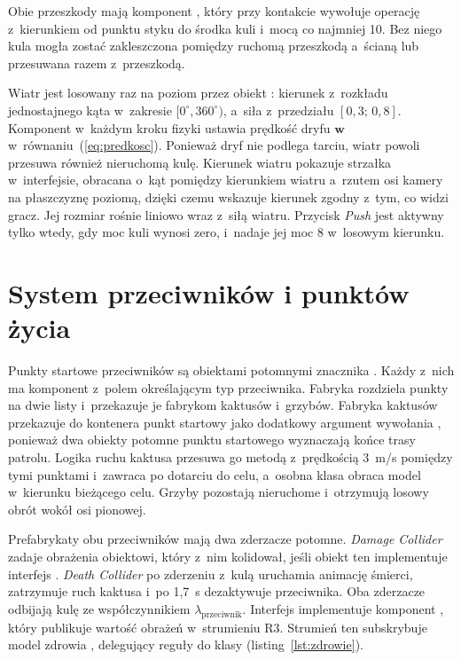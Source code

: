 Obie przeszkody mają komponent , który przy kontakcie wywołuje
operację  z~kierunkiem od punktu styku do środka kuli i~mocą co najmniej 10.
Bez niego kula mogła zostać zakleszczona pomiędzy ruchomą przeszkodą a~ścianą lub
przesuwana razem z~przeszkodą.

Wiatr jest losowany raz na poziom przez obiekt : kierunek z~rozkładu
jednostajnego kąta w~zakresie $[0^\circ, 360^\circ)$, a~siła z~przedziału $[0{,}3;\,0{,}8]$.
Komponent  w~każdym kroku fizyki ustawia prędkość dryfu $\mathbf{w}$
w~równaniu~(\ref{eq:predkosc}). Ponieważ dryf nie podlega tarciu, wiatr powoli przesuwa
również nieruchomą kulę. Kierunek wiatru pokazuje strzałka w~interfejsie, obracana
o~kąt pomiędzy kierunkiem wiatru a~rzutem osi kamery na płaszczyznę poziomą, dzięki czemu
wskazuje kierunek zgodny z~tym, co widzi gracz. Jej rozmiar rośnie liniowo wraz z~siłą
wiatru. Przycisk \emph{Push} jest aktywny tylko wtedy, gdy moc kuli wynosi zero, i~nadaje
jej moc 8 w~losowym kierunku.

\section{System przeciwników i punktów życia}

Punkty startowe przeciwników są obiektami potomnymi znacznika .
Każdy z~nich ma komponent  z~polem określającym typ przeciwnika.
Fabryka  rozdziela punkty na dwie listy i~przekazuje je fabrykom
kaktusów i~grzybów. Fabryka kaktusów przekazuje do kontenera punkt startowy jako
dodatkowy argument wywołania , ponieważ dwa obiekty
potomne punktu startowego wyznaczają końce trasy patrolu. Logika ruchu kaktusa przesuwa go
metodą  z~prędkością 3~m/s pomiędzy tymi punktami i~zawraca po
dotarciu do celu, a~osobna klasa obraca model w~kierunku bieżącego celu. Grzyby pozostają
nieruchome i~otrzymują losowy obrót wokół osi pionowej.

Prefabrykaty obu przeciwników mają dwa zderzacze potomne. \emph{Damage Collider} zadaje
obrażenia obiektowi, który z~nim kolidował, jeśli obiekt ten implementuje interfejs
. \emph{Death Collider} po zderzeniu z~kulą uruchamia animację śmierci,
zatrzymuje ruch kaktusa i~po 1,7~s dezaktywuje przeciwnika. Oba zderzacze odbijają kulę
ze współczynnikiem $\lambda_{\text{przeciwnik}}$. Interfejs  implementuje
komponent , który publikuje wartość obrażeń w~strumieniu R3. Strumień
ten subskrybuje model zdrowia , delegujący reguły do klasy
 (listing~\ref{lst:zdrowie}).

